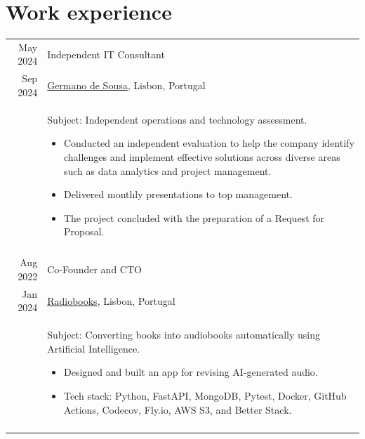 \documentclass[a4paper,11pt]{article}
\def\datespace{-2pt}
\def\title-main-sep{4pt}
\def\tabwidth{13cm}
\begin{document}

  \newpage

  \section{Work experience}

    \begin{tabular}{r|p{\tabwidth}}

      {\small May 2024} 	& Independent IT Consultant \\[\datespace]
      {\small Sep 2024} 	& {\small \href{https://www.germanodesousa.com/en/}{Germano de Sousa}, Lisbon, Portugal} \\[\title-main-sep]
      & {
        \parbox[t]{\tabwidth}{
        \footnotesize Subject: Independent operations and technology assessment.
        \begin{itemize}[topsep=0pt, partopsep=0pt, parsep=0pt, itemsep=0pt, leftmargin=*, after=\vspace{0pt}]
          \item Conducted an independent evaluation to help the company identify challenges and implement effective solutions across diverse areas such as data analytics and project management.
          \item Delivered monthly presentations to top management.
          \item The project concluded with the preparation of a Request for Proposal. 
        \end{itemize}
        }
      } \\
      \multicolumn{2}{c}{} \\

      {\small Aug 2022} & Co-Founder and CTO \\[\datespace]
      {\small Jan 2024} & {\small \href{https://radiobooks.webflow.io/}{Radiobooks}, Lisbon, Portugal} \\[\title-main-sep]
      & {
      \parbox[t]{\tabwidth}{
      \footnotesize Subject: Converting books into audiobooks automatically using Artificial Intelligence.
      \begin{itemize}[topsep=0pt, partopsep=0pt, parsep=0pt, itemsep=0pt, leftmargin=*, after=\vspace{0pt}]
        \item Designed and built an app for revising AI-generated audio.
        \item Tech stack: Python, FastAPI, MongoDB, Pytest, Docker, GitHub Actions, Codecov, Fly.io, AWS S3, and Better Stack.
      \end{itemize}
      }
      } \\
      \multicolumn{2}{c}{} \\


\end{tabular}
\end{document}
